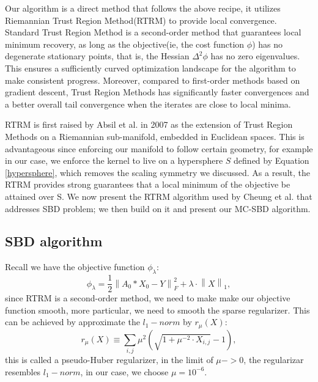 Our algorithm is a direct method that follows the above recipe, it utilizes Riemannian Trust Region Method(RTRM) to provide local convergence. Standard Trust Region Method is a second-order method that guarantees local minimum recovery, as long as the objective(ie, the cost function $\phi$) has no degenerate stationary points, that is, the Hessian $\Delta^2\phi$ has no zero eigenvalues. This ensures a sufficiently curved optimization landscape for the algorithm to make consistent progress. Moreover, compared to first-order methods based on gradient descent, Trust Region Methods has significantly faster convergences and a better overall tail convergence when the iterates are close to local minima. 

\ac{RTRM} is first raised by Absil et al. in 2007 as the extension of Trust Region Methods on a Riemannian sub-manifold, embedded in Euclidean spaces. This is advantageous since enforcing our manifold to follow certain geometry, for example in our case, we enforce the kernel to live on a hypersphere $S$ defined by Equation \ref{hypersphere}, which removes the scaling symmetry we discussed. As a result, the \ac{RTRM} provides strong guarantees that a local minimum of the objective be attained over S. We now present the \ac{RTRM} algorithm used by Cheung et al. \cite{cheungDictionaryLearningFouriertransform2020} that addresses \ac{SBD} problem; we then build on it and present our \ac{MC-SBD} algorithm. 

\subsection{SBD algorithm}
Recall we have the objective function $\phi_{\lambda}$: 
\begin{equation}
	\phi_{\lambda} = \frac{1}{2}\left\lVert A_0 * X_0 - Y \right\rVert^2_F + \lambda \cdot  \left\lVert X\right\rVert_1,
\end{equation}
since \ac{RTRM} is a second-order method, we need to make make our objective function smooth, more particular, we need to smooth the sparse regularizer. This can be achieved by approximate the $l_1-norm$ by $r_{\mu}(X)$:
\begin{equation}
	r_{\mu}(X) \equiv \sum_{i,j} \mu^2(\sqrt{1+\mu^{-2}\cdot X_{i,j}}-1), 
\end{equation}
this is called a pseudo-Huber regularizer, in the limit of $\mu -> 0$, the regularizar resembles $l_1-norm$, in our case, we choose $\mu = 10^{-6}$. 

